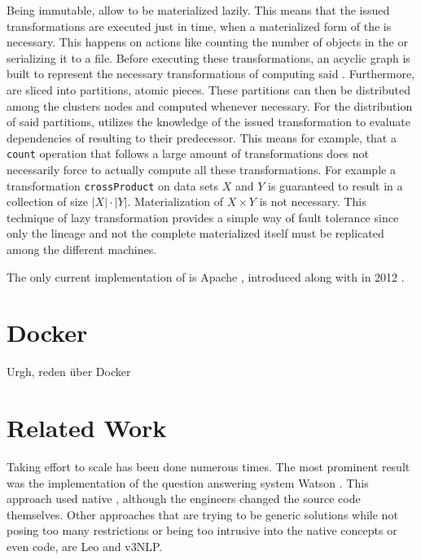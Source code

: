 Being immutable, \rdds{} allow to be materialized lazily. This means that the issued transformations are executed just in time, when a materialized form of the \rdd{} is necessary. This happens on actions like counting the number of objects in the \rdd{} or serializing it to a file. Before executing these transformations, an acyclic graph is built to represent the necessary transformations of computing said \rdd{}. Furthermore, \rdds{} are sliced into partitions, atomic pieces. These partitions can then be distributed among the clusters nodes and computed whenever necessary. For the distribution of said partitions, \spark{} utilizes the knowledge of the issued transformation to evaluate dependencies of resulting \rdds{} to their predecessor. This means for example, that a \lstinline|count| operation that follows a large amount of transformations does not necessarily force \spark{} to actually compute all these transformations. For example a transformation \lstinline|crossProduct| on data sets $X$ and $Y$ is guaranteed to result in a collection of size $|X|\cdot{}|Y|$. Materialization of $X\times{}Y$ is not necessary. This technique of lazy transformation provides a simple way of fault tolerance since only the \rdd{} lineage and not the complete materialized \rdd{} itself must be replicated among the different machines.

The only current implementation of \rdds{} is Apache \spark{}, introduced along with \rdds{} in 2012 \cite{zaharia2012resilient}.

\section{Docker}
Urgh, reden über Docker

\section{Related Work}
\label{sec:related}
Taking effort to scale \uima{} has been done numerous times. The most prominent result was the implementation of the question answering system Watson \cite{epstein2012making}. This approach used native \uimaas{}, although the engineers changed the \uimaas{} source code themselves. Other approaches that are trying to be generic solutions while not posing too many restrictions or being too intrusive into the native \uima{} concepts or even code, are Leo and v3NLP.

